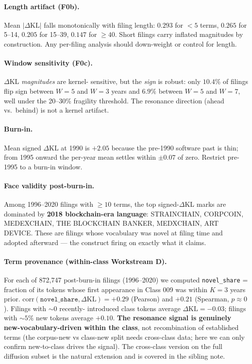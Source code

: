 \documentclass[11pt]{article}
\begin{document}
\paragraph{Length artifact (F0b).} Mean $|\Delta\mathrm{KL}|$ falls
monotonically with filing length: $0.293$ for $<5$ terms, $0.265$ for 5--14,
$0.205$ for 15--39, $0.147$ for $\geq 40$. Short filings carry inflated
magnitudes by construction. Any per-filing analysis should down-weight or
control for length.

\paragraph{Window sensitivity (F0c).} $\Delta$KL \emph{magnitudes} are kernel-
sensitive, but the \emph{sign} is robust: only $10.4\%$ of filings flip sign
between $W=5$ and $W=3$ years and $6.9\%$ between $W=5$ and $W=7$, well under
the 20--30\% fragility threshold. The resonance direction (ahead vs.\ behind)
is not a kernel artifact.

\paragraph{Burn-in.} Mean signed $\Delta$KL at 1990 is $+2.05$ because the
pre-1990 software past is thin; from 1995 onward the per-year mean settles
within $\pm 0.07$ of zero. Restrict pre-1995 to a burn-in window.

\paragraph{Face validity post-burn-in.} Among 1996--2020 filings with $\geq 10$
terms, the top signed-$\Delta$KL marks are dominated by \textbf{2018
blockchain-era language}: STRAINCHAIN, CORPCOIN, MEDEXCHAIN, THE BLOCKCHAIN
BANKER, MEDXCHAIN, ART DEVICE. These are filings whose vocabulary was novel
at filing time and adopted afterward --- the construct firing on exactly what
it claims.

\paragraph{Term provenance (within-class Workstream D).} For each of 872{,}747
post-burn-in filings (1996--2020) we computed \texttt{novel\_share} = fraction
of its tokens whose first appearance in Class 009 was within $K=3$ years prior.
$\mathrm{corr}(\texttt{novel\_share}, \Delta\mathrm{KL}) = \mathbf{+0.29}$
(Pearson) and $+0.21$ (Spearman, $p \approx 0$). Filings with $\sim 0$ recently-
introduced class tokens average $\Delta\mathrm{KL} = -0.03$; filings with $\sim
5\%$ new tokens average $+0.10$. \textbf{The resonance signal is genuinely
new-vocabulary-driven within the class}, not recombination of established
terms (the corpus-new vs class-new split needs cross-class data; here we can
only confirm new-to-class drives the signal). The cross-class version on the
full diffusion subset is the natural extension and is covered in the sibling
note.
\end{document}
